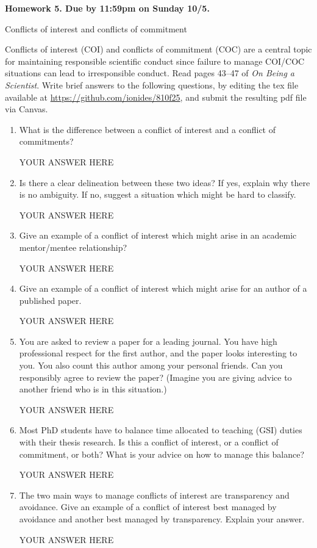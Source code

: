 \documentclass[12pt]{article}
\begin{document}
\begin{center}\bf
Homework 5. Due by 11:59pm on Sunday 10/5.

Conflicts of interest and conflicts of commitment

\end{center}
Conflicts of interest (COI) and conflicts of commitment (COC) are a central topic for maintaining responsible scientific conduct since failure to manage COI/COC situations can lead to irresponsible conduct. Read pages 43--47 of {\em On Being a Scientist}. Write brief answers to the following questions, by editing the tex file available at \url{https://github.com/ionides/810f25}, and submit the resulting pdf file via Canvas.

\begin{enumerate}

\item What is the difference between a conflict of interest and a conflict of commitments? 

YOUR ANSWER HERE

\item Is there a clear delineation between these two ideas? If yes, explain why there is no ambiguity. If no, suggest a situation which might be hard to classify.

YOUR ANSWER HERE

\item Give an example of a conflict of interest which might arise in an academic mentor/mentee relationship?

YOUR ANSWER HERE

\item Give an example of a conflict of interest which might arise for an author of a published paper.

YOUR ANSWER HERE

\item You are asked to review a paper for a leading journal. You have high professional respect for the first author, and the paper looks interesting to you. You also count this author among your personal friends. Can you responsibly agree to review the paper? (Imagine you are giving advice to another friend who is in this situation.)

YOUR ANSWER HERE

\item Most PhD students have to balance time allocated to teaching (GSI) duties with their thesis research. Is this a conflict of interest, or a conflict of commitment, or both? What is your advice on how to manage this balance?

YOUR ANSWER HERE

\item The two main ways to manage conflicts of interest are transparency and avoidance. Give an example of a conflict of interest best managed by avoidance and another best managed by transparency. Explain your answer.

YOUR ANSWER HERE

\end{enumerate}
\end{document}
